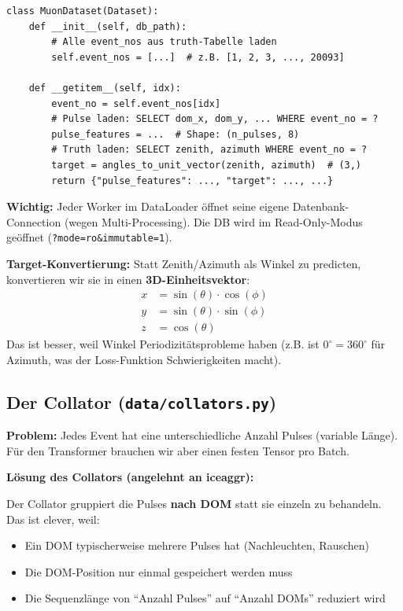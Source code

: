 \documentclass[12pt, a4paper]{article}
\begin{document}
\begin{lstlisting}[caption={MuonDataset -- vereinfacht}]
class MuonDataset(Dataset):
    def __init__(self, db_path):
        # Alle event_nos aus truth-Tabelle laden
        self.event_nos = [...]  # z.B. [1, 2, 3, ..., 20093]

    def __getitem__(self, idx):
        event_no = self.event_nos[idx]
        # Pulse laden: SELECT dom_x, dom_y, ... WHERE event_no = ?
        pulse_features = ...  # Shape: (n_pulses, 8)
        # Truth laden: SELECT zenith, azimuth WHERE event_no = ?
        target = angles_to_unit_vector(zenith, azimuth)  # (3,)
        return {"pulse_features": ..., "target": ..., ...}
\end{lstlisting}

\textbf{Wichtig:} Jeder Worker im DataLoader \"offnet seine eigene
Datenbank-Connection (wegen Multi-Processing). Die DB wird im Read-Only-Modus
ge\"offnet (\texttt{?mode=ro\&immutable=1}).

\textbf{Target-Konvertierung:} Statt Zenith/Azimuth als Winkel zu predicten,
konvertieren wir sie in einen \textbf{3D-Einheitsvektor}:
\begin{align}
    x &= \sin(\theta) \cdot \cos(\phi) \\
    y &= \sin(\theta) \cdot \sin(\phi) \\
    z &= \cos(\theta)
\end{align}
Das ist besser, weil Winkel Periodizit\"atsprobleme haben (z.B. ist $0^\circ = 360^\circ$
f\"ur Azimuth, was der Loss-Funktion Schwierigkeiten macht).

\subsection{Der Collator (\texttt{data/collators.py})}

\textbf{Problem:} Jedes Event hat eine unterschiedliche Anzahl Pulses
(variable L\"ange). F\"ur den Transformer brauchen wir aber einen festen
Tensor pro Batch.

\textbf{L\"osung des Collators (angelehnt an iceaggr):}

Der Collator gruppiert die Pulses \textbf{nach DOM} statt sie einzeln zu behandeln.
Das ist clever, weil:
\begin{itemize}
    \item Ein DOM typischerweise mehrere Pulses hat (Nachleuchten, Rauschen)
    \item Die DOM-Position nur einmal gespeichert werden muss
    \item Die Sequenzl\"ange von ``Anzahl Pulses'' auf ``Anzahl DOMs'' reduziert wird
\end{itemize}
\end{document}

